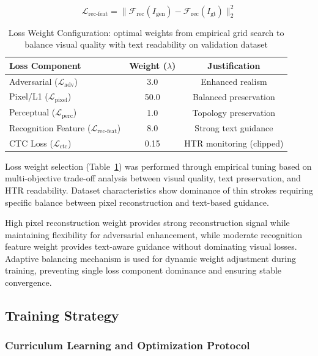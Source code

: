 \documentclass[journal]{IEEEtran}
\begin{document}
\begin{equation}
\mathcal{L}_{\text{rec-feat}} = \|\mathcal{F}_{\text{rec}}(I_{\text{gen}}) - \mathcal{F}_{\text{rec}}(I_{\text{gt}})\|_2^2
\end{equation}

\begin{table}[!t]
\renewcommand{\arraystretch}{1.3}
\caption{Loss Weight Configuration: optimal weights from empirical grid search to balance visual quality with text readability on validation dataset}
\label{table_optimal_weights}
\centering
\begin{tabular}{|l|c|c|}
\hline
Loss Component & Weight ($\lambda$) & Justification \\
\hline
Adversarial ($\mathcal{L}_{\text{adv}}$) & 3.0 & Enhanced realism \\
Pixel/L1 ($\mathcal{L}_{\text{pixel}}$) & 50.0 & Balanced preservation \\
Perceptual ($\mathcal{L}_{\text{perc}}$) & 1.0 & Topology preservation \\
Recognition Feature ($\mathcal{L}_{\text{rec-feat}}$) & 8.0 & Strong text guidance \\
CTC Loss ($\mathcal{L}_{\text{ctc}}$) & 0.15 & HTR monitoring (clipped) \\
\hline
\end{tabular}
\end{table}

Loss weight selection (Table~\ref{table_optimal_weights}) was performed through empirical tuning based on multi-objective trade-off analysis between visual quality, text preservation, and HTR readability. Dataset characteristics show dominance of thin strokes requiring specific balance between pixel reconstruction and text-based guidance.

High pixel reconstruction weight provides strong reconstruction signal while maintaining flexibility for adversarial enhancement, while moderate recognition feature weight provides text-aware guidance without dominating visual losses. Adaptive balancing mechanism is used for dynamic weight adjustment during training, preventing single loss component dominance and ensuring stable convergence.

\subsection{Training Strategy}

\subsubsection{Curriculum Learning and Optimization Protocol}
\end{document}
